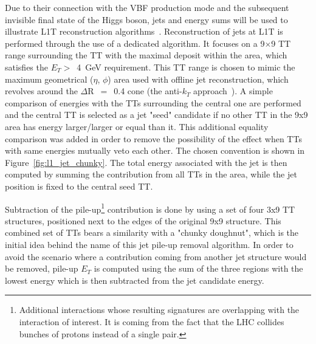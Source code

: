 \hspace{10pt} Due to their connection with the VBF production mode and the subsequent invisible final state of the Higgs boson, jets and energy sums will be used to illustrate L1T reconstruction algorithms~\cite{cms:l1_paper,Antoni}. Reconstruction of jets at L1T is performed through the use of a dedicated algorithm. It focuses on a 9$\times$9 TT range surrounding the TT with the maximal deposit within the area, which satisfies the $E_T>$~4~GeV requirement. This TT range is chosen to mimic the maximum geometrical ($\eta$, $\phi$) area used with offline jet reconstruction, which revolves around the $\Delta$R~$=$~0.4 cone (the anti-$k_T$ approach~\cite{anti_kt}). A simple comparison of energies with the TTs surrounding the central one are performed and the central TT is selected as a jet "seed" candidate if no other TT in the 9x9 area has energy larger/larger or equal than it. This additional equality comparison was added in order to remove the possibility of the effect when TTs with same energies mutually veto each other. The chosen convention is shown in Figure~\ref{fig:l1_jet_chunky}. The total energy associated with the jet is then computed by summing the contribution from all TTs in the area, while the jet position is fixed to the central seed TT. 

\hspace{10pt} Subtraction of the pile-up\footnote{Additional interactions whose resulting signatures are overlapping with the interaction of interest. It is coming from the fact that the LHC collides bunches of protons instead of a single pair.} contribution is done by using a set of four 3x9 TT structures, positioned next to the edges of the original 9x9 structure. This combined set of TTs bears a similarity with a "chunky doughnut", which is the initial idea behind the name of this jet pile-up removal algorithm. In order to avoid the scenario where a contribution coming from another jet structure would be removed, pile-up $E_T$ is computed using the sum of the three regions with the lowest energy which is then subtracted from the jet candidate energy.
 
